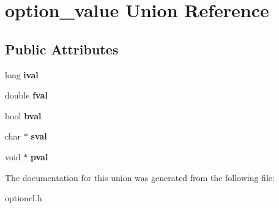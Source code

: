 \hypertarget{unionoption__value}{
\section{option\_\-value Union Reference}
\label{unionoption__value}
}
\subsection*{Public Attributes}
\begin{DoxyCompactItemize}
\item 
\hypertarget{unionoption__value_a9aac131c9b94b22baa25ca7bd577aa79}{
long {\bfseries ival}}
\label{unionoption__value_a9aac131c9b94b22baa25ca7bd577aa79}

\item 
\hypertarget{unionoption__value_a04b0aca89c7a7d36a3614d77e764538b}{
double {\bfseries fval}}
\label{unionoption__value_a04b0aca89c7a7d36a3614d77e764538b}

\item 
\hypertarget{unionoption__value_ae2f3b780312ac1c942829543cc939a73}{
bool {\bfseries bval}}
\label{unionoption__value_ae2f3b780312ac1c942829543cc939a73}

\item 
\hypertarget{unionoption__value_abf07543ff683523252d1109afa373348}{
char $\ast$ {\bfseries sval}}
\label{unionoption__value_abf07543ff683523252d1109afa373348}

\item 
\hypertarget{unionoption__value_ace848858c052f23be603a63780ebbbae}{
void $\ast$ {\bfseries pval}}
\label{unionoption__value_ace848858c052f23be603a63780ebbbae}

\end{DoxyCompactItemize}


The documentation for this union was generated from the following file:\begin{DoxyCompactItemize}
\item 
optioncl.h\end{DoxyCompactItemize}
